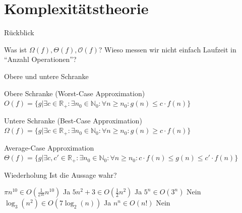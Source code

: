 \documentclass{beamer}
\begin{document}
\newcommand{\okalk}{\mathcal{O}}

\begin{frame}
	\titlepage
\end{frame}

\section{Komplexitätstheorie}
\begin{frame}{Rückblick}
	\begin{itemize}
		\pitem Was ist $\Omega(f), \Theta(f), \okalk(f)$?
		\pitem Wieso messen wir nicht einfach Laufzeit in ``Anzahl Operationen''?
	\end{itemize}
\end{frame}

\begin{frame}{Obere und untere Schranke}
	\begin{block}{Obere Schranke (Worst-Case Approximation)}
		$O(f) = \{g| \exists c \in \mathbb{R}_+ : \exists n_0 \in \mathbb{N}_0: \forall n \geq n_0 : g(n)\leq c \cdot f(n)\}$
	\end{block}
	
	\pause
	
	\begin{block}{Untere Schranke (Best-Case Approximation)}
		$\Omega(f) = \{g| \exists c \in \mathbb{R}_+ : \exists n_0 \in \mathbb{N}_0: \forall n \geq n_0 : g(n)\geq c \cdot f(n)\}$
	\end{block}

	\pause

	\begin{block}{Average-Case Approximation}
		$\Theta(f) = \{g|\exists c, c' \in \mathbb{R}_+ : \exists n_0 \in \mathbb{N}_0: \forall n \geq n_0 : c \cdot f(n) \leq g(n)\leq c' \cdot f(n)\}$
	\end{block}

	\pause
	
\end{frame}

\begin{frame}{Wiederholung}
Ist die Aussage wahr?
\begin{itemize}
\pitem $\pi n^{10} \in O(\frac{1}{e^{10}} n^{10})$ \pause Ja
\pitem $5n^2+3 \in O(\frac{1}{2}n^2)$ \pause Ja
\pitem $5^n \in O(3^n)$ \pause Nein
\pitem $\log_3(n^2) \in O(7\log_2(n))$ \pause Ja
\pitem $n^n \in O(n!)$ \pause Nein

\end{itemize}

\end{frame}
\end{document}
